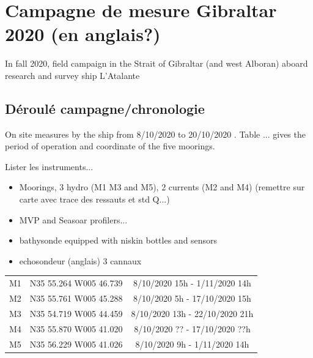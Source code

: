\hypersetup{pdfborder=0 0 0}



\section{Campagne de mesure Gibraltar 2020 (en anglais?)}
In fall 2020, field campaign in the Strait of Gibraltar (and west Alboran) aboard research and survey ship L'Atalante

\subsection{Déroulé campagne/chronologie}


On site measures by the ship from 8/10/2020 to 20/10/2020 . Table ... gives the period of operation and coordinate of the five moorings.


Lister les instruments...

\begin{itemize}
\item Moorings, 3 hydro (M1 M3 and M5), 2 currents (M2 and M4)  (remettre sur carte avec trace des ressauts et std Q...)
\item MVP and Seasoar profilers...
\item bathysonde equipped with niskin bottles and sensors
\item echosondeur (anglais) 3 cannaux
\end{itemize}

\begin{table}[!h]
        \centering
        \begin{tabular}{|c|c|c|}
                \hline
                M1 & N35 55.264 W005 46.739 & 8/10/2020 15h - 1/11/2020 14h\\
                M2 & N35 55.761 W005 45.288 & 8/10/2020 5h - 17/10/2020 15h\\
                M3 & N35 54.719 W005 44.459 & 8/10/2020 13h - 22/10/2020 21h\\
                M4 & N35 55.870 W005 41.020 & 8/10/2020 ?? - 17/10/2020 ??h\\
                M5 & N35 56.229 W005 41.026 & 8/10/2020 9h - 1/11/2020 14h\\
                \hline
        \end{tabular}
\end{table}


